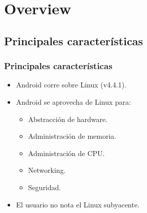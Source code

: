 \section{Overview}

\subsection{Principales características}
\begin{frame}
  \frametitle{Principales características}
  \begin{itemize}
    \item Android corre sobre Linux (v4.4.1).
    
    \item Android se aprovecha de Linux para:
      \begin{itemize}
  \item Abstracción de hardware.
  \item Administración de memoria.
  \item Administración de CPU.
  \item Networking.
  \item Seguridad.
      \end{itemize}
    
    \item El usuario no nota el Linux subyacente.
  \end{itemize}
\end{frame}

